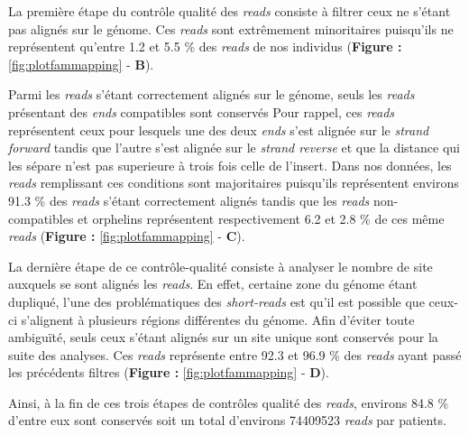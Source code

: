 \documentclass[12pt,twoside]{ugathesis}
\begin{document}
La première étape du contrôle qualité des \emph{reads} consiste à
filtrer ceux ne s'étant pas alignés sur le génome. Ces \emph{reads} sont
extrêmement minoritaires puisqu'ils ne représentent qu'entre 1.2 et 5.5
\% des \emph{reads} de nos individus (\textbf{Figure :
}\ref{fig:plotfammapping} - \textbf{B}).

Parmi les \emph{reads} s'étant correctement alignés sur le génome, seuls
les \emph{reads} présentant des \emph{ends} compatibles sont conservés
Pour rappel, ces \emph{reads} représentent ceux pour lesquels une des
deux \emph{ends} s'est alignée sur le \emph{strand forward} tandis que
l'autre s'est alignée sur le \emph{strand reverse} et que la distance
qui les sépare n'est pas superieure à trois fois celle de l'insert. Dans
nos données, les \emph{reads} remplissant ces conditions sont
majoritaires puisqu'ils représentent environs 91.3 \% des \emph{reads}
s'étant correctement alignés tandis que les \emph{reads} non-compatibles
et orphelins représentent respectivement 6.2 et 2.8 \% de ces même
\emph{reads} (\textbf{Figure : }\ref{fig:plotfammapping} - \textbf{C}).

La dernière étape de ce contrôle-qualité consiste à analyser le nombre
de site auxquels se sont alignés les \emph{reads}. En effet, certaine
zone du génome étant dupliqué, l'une des problématiques des
\emph{short-reads} est qu'il est possible que ceux-ci s'alignent à
plusieurs régions différentes du génome. Afin d'éviter toute ambiguïté,
seuls ceux s'étant alignés sur un site unique sont conservés pour la
suite des analyses. Ces \emph{reads} représente entre 92.3 et 96.9 \%
des \emph{reads} ayant passé les précédents filtres (\textbf{Figure :
}\ref{fig:plotfammapping} - \textbf{D}).

Ainsi, à la fin de ces trois étapes de contrôles qualité des
\emph{reads}, environs 84.8 \% d'entre eux sont conservés soit un total
d'environs 74409523 \emph{reads} par patients.

\newpage 
\end{document}
